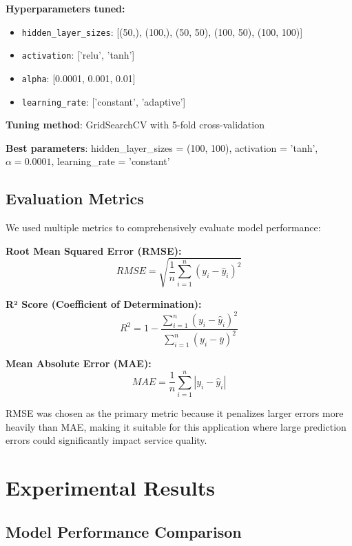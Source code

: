 \documentclass[conference]{IEEEtran}
\begin{document}
\textbf{Hyperparameters tuned:}
\begin{itemize}
    \item \texttt{hidden\_layer\_sizes}: [(50,), (100,), (50, 50), (100, 50), (100, 100)]
    \item \texttt{activation}: ['relu', 'tanh']
    \item \texttt{alpha}: [0.0001, 0.001, 0.01]
    \item \texttt{learning\_rate}: ['constant', 'adaptive']
\end{itemize}

\textbf{Tuning method}: GridSearchCV with 5-fold cross-validation

\textbf{Best parameters}: hidden\_layer\_sizes = (100, 100), activation = 'tanh', $\alpha = 0.0001$, learning\_rate = 'constant'

\subsection{Evaluation Metrics}
We used multiple metrics to comprehensively evaluate model performance:

\textbf{Root Mean Squared Error (RMSE):}
\begin{equation}
    RMSE = \sqrt{\frac{1}{n}\sum_{i=1}^{n}(y_i - \hat{y}_i)^2}
\end{equation}

\textbf{R² Score (Coefficient of Determination):}
\begin{equation}
    R^2 = 1 - \frac{\sum_{i=1}^{n}(y_i - \hat{y}_i)^2}{\sum_{i=1}^{n}(y_i - \bar{y})^2}
\end{equation}

\textbf{Mean Absolute Error (MAE):}
\begin{equation}
    MAE = \frac{1}{n}\sum_{i=1}^{n}|y_i - \hat{y}_i|
\end{equation}

RMSE was chosen as the primary metric because it penalizes larger errors more heavily than MAE, making it suitable for this application where large prediction errors could significantly impact service quality.

\section{Experimental Results}
\label{results}

\subsection{Model Performance Comparison}
\end{document}
